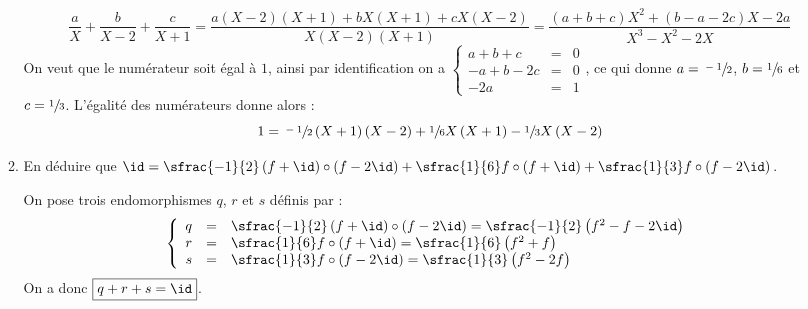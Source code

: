 \documentclass[a4paper,french,bookmarks]{article}
\begin{document}
\begin{enumerate}
\begin{enumerate}
{            \[ \dfrac{a}{X} + \dfrac{b}{X-2} + \dfrac{c}{X+1} =
            \dfrac{a\left(X - 2\right)\left(X+1\right) +
            bX\left(X+1\right) +
            cX\left(X-2\right)}{X\left(X-2\right)\left(X+1\right)} =
            \dfrac{\left(a + b + c\right)X^2 + \left(b - a - 2c\right)X
            - 2a}{X^3 - X^2 - 2X}\]
            On veut que le numérateur soit égal à $1$, ainsi par
            identification on a $\left\lbrace\begin{array}{rcl}
                a + b + c &=& 0 \\
                - a + b - 2c &=& 0 \\
                -2a &=& 1
            \end{array}\right.$, ce qui donne $a = \sfrac{-1}{2}$, $b =
            \sfrac{1}{6}$ et $c = \sfrac{1}{3}$. L'égalité des
            numérateurs donne alors :
            \[ 1 = \sfrac{-1}{2}\left(X + 1\right)\left(X - 2\right) +
            \sfrac{1}{6}X\left(X+1\right) -
            \sfrac{1}{3}X\left(X-2\right) \]
        }
        
        \item En déduire que $\id = \sfrac{-1}{2}\left(f +
        \id\right)\circ\left(f - 2\id\right) + \sfrac{1}{6}f\circ
        \left(f + \id\right) + \sfrac{1}{3} f \circ \left(f -
        2\id\right)$.
        
        On pose trois endomorphismes $q$, $r$ et $s$ définis par :
        \begin{equation}
            \left\lbrace\begin{array}{rcl}
                q &=& \sfrac{-1}{2}\left(f + \id\right)\circ\left(f -
                2\id\right)= \sfrac{-1}{2}\left(f^2 - f - 2\id\right)\\
                r &=& \sfrac{1}{6}f\circ \left(f +
                \id\right)=\sfrac{1}{6}\left(f^2 + f\right)\\
                s &=& \sfrac{1}{3} f \circ \left(f - 2\id\right) =
                \sfrac{1}{3}\left(f^2 - 2f\right)
            \end{array}\right.
        \end{equation}
        On a donc $\boxed{q + r + s = \id}$.
    \end{enumerate}
    
\end{enumerate}
\end{document}
